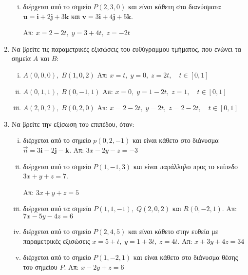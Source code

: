 \begin{enumerate}
\begin{enumerate}[i)]
      \item διέρχεται από το σημείο $ P(2,3,0) $ και είναι κάθετη στα διανύσματα 
        $ \mathbf{u} = \mathbf{i}+2 \mathbf{j}+3 \mathbf{k} $ και $ \mathbf{v} = 3
        \mathbf{i}+ 4 \mathbf{j}+5 \mathbf{k} $.

        \hfill Απ: $ x=2-2t, \; y=3+4t, \; z=-2t $  
    \end{enumerate}

  \item Να βρείτε τις παραμετρικές εξισώσεις του ευθύγραμμου τμήματος, που ενώνει 
    τα σημεία $A$ και $B$:
    \begin{enumerate}[i)]
      \item $ A(0,0,0), \; B(1,0,2) $ \hfill Απ: $ x=t, \; y=0, \; z=2t, \quad t \in
        [0,1] $  
      \item $ A(0,1,1), \; B(0,-1,1) $ \hfill Απ: $ x=0, \; y=1-2t, \; z=1, \quad t \in
        [0,1] $ 
      \item $ A(2,0,2), \; B(0,2,0) $ \hfill Απ: $ x=2-2t, \; y=2t, \; z=2-2t, 
        \quad t \in [0,1] $ 
    \end{enumerate}

  \item Να βρείτε την εξίσωση του επιπέδου, όταν:
    \begin{enumerate}[i)]
      \item διέρχεται από το σημείο $ p(0,2,-1) $ και είναι κάθετο στο διάνυσμα 
        $ \vec{n} = 3 \mathbf{i}-2 \mathbf{j}- \mathbf{k} $. 
        \hfill Απ: $ 3x-2y-z=-3 $ 

      \item διέρχεται από το σημείο $ P(1,-1,3) $ και είναι παράλληλο προς το επίπεδο 
        $ 3x+y+z=7 $.

        \hfill Απ: $ 3x+y+z=5 $  

      \item διέρχεται από τα σημεία $ P(1,1,-1), \; Q(2,0,2) $ και $ R(0,-2,1) $.
        \hfill Απ: $ 7x-5y-4z=6 $ 

      \item διέρχεται από το σημείο $ P(2,4,5) $ και είναι κάθετο στην ευθεία με
        παραμετρικές εξισώσεις $ x=5+t, \; y=1+3t, \; z=4t $.
        \hfill Απ: $ x+3y+4z=34 $ 

      \item διέρχεται από το σημείο $ P(1,-2,1) $ και είναι κάθετο στο διάνυσμα θέσης 
        του σημείου $ P $.
        \hfill Απ: $ x-2y+z=6 $ 
    \end{enumerate}


\end{enumerate}
